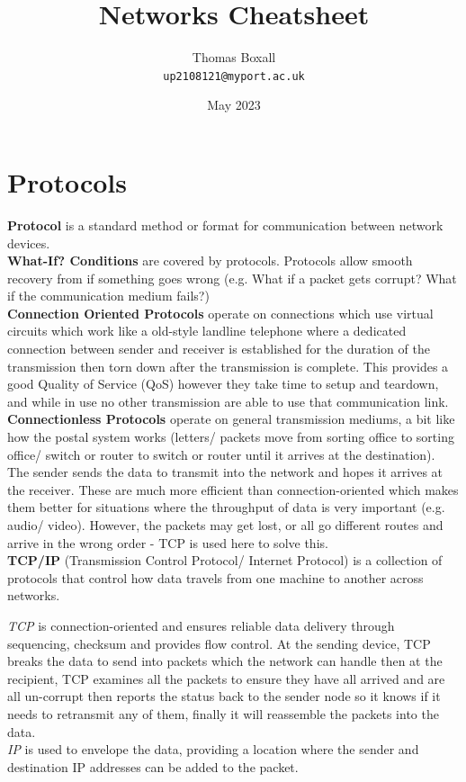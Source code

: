 \documentclass[a4paper,11pt]{article}
\title{Networks Cheatsheet}
\author{Thomas Boxall\\ \texttt{up2108121@myport.ac.uk}}
\date{May 2023}
\begin{document}
\maketitle
\thispagestyle{fancy}

\section{Protocols}
\textbf{Protocol} is a standard method or format for communication between network devices.\\
\textbf{What-If? Conditions} are covered by protocols. Protocols allow smooth recovery from if something goes wrong (e.g. What if a packet gets corrupt? What if the communication medium fails?)\\
\textbf{Connection Oriented Protocols} operate on connections which use virtual circuits which work like a old-style landline telephone where a dedicated connection between sender and receiver is established for the duration of the transmission then torn down after the transmission is complete. This provides a good Quality of Service (QoS) however they take time to setup and teardown, and while in use no other transmission are able to use that communication link.\\
\textbf{Connectionless Protocols} operate on general transmission mediums, a bit like how the postal system works (letters/ packets move from sorting office to sorting office/ switch or router to switch or router until it arrives at the destination). The sender sends the data to transmit into the network and hopes it arrives at the receiver. These are much more efficient than connection-oriented which makes them better for situations where the throughput of data is very important (e.g. audio/ video). However, the packets may get lost, or all go different routes and arrive in the wrong order - TCP is used here to solve this.\\
\textbf{TCP/IP} (Transmission Control Protocol/ Internet Protocol) is a collection of protocols that control how data travels from one machine to another across networks.
\begin{adjustwidth}{2em}{1em}
\textit{TCP} is connection-oriented and ensures reliable data delivery through sequencing, checksum and provides flow control. At the sending device, TCP breaks the data to send into packets which the network can handle then at the recipient, TCP examines all the packets to ensure they have all arrived and are all un-corrupt then reports the status back to the sender node so it knows if it needs to retransmit any of them, finally it will reassemble the packets into the data.\\
\textit{IP} is used to envelope the data, providing a location where the sender and destination IP addresses can be added to the packet.
\end{adjustwidth}
\end{document}
